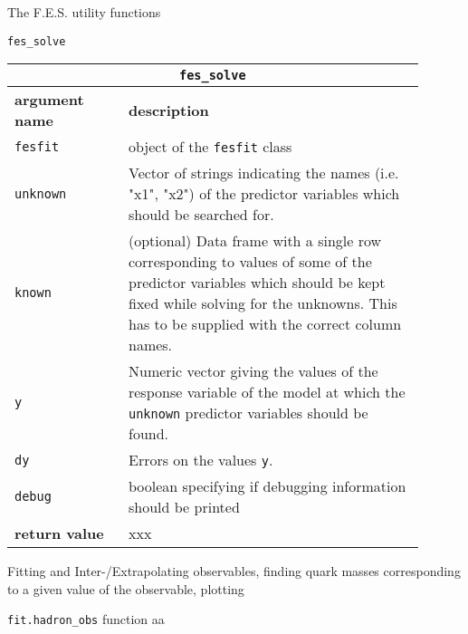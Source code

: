 \documentclass[10pt,a4paper]{article}
\begin{document}
\begin{section}{The F.E.S. utility functions}
\begin{subsection}{ {\tt fes\_solve} }
{ \centering
\begin{tabular}{|p{0.25\linewidth}|p{0.65\linewidth}|}
\hline
\multicolumn{2}{|c|}{ {\tt fes\_solve} } \\
\hline \hline \textbf{argument name} & \textbf{description} \\
\hline {\tt fesfit} & object of the {\tt fesfit} class \\ 
{\tt unknown} & Vector of strings indicating the names (i.e. "x1", "x2") of the predictor variables which should be searched for. \\ 
{\tt known} & (optional) Data frame with a single row corresponding to values of some of the predictor variables which should be kept fixed while solving for the unknowns. This has to be supplied with the correct column names. \\
{\tt y} & Numeric vector giving the values of the response variable of the model at which the {\tt unknown} predictor variables should be found. \\
{\tt dy} & Errors on the values {\tt y}. \\
{\tt debug} & boolean specifying if debugging information should be printed \\
\hline \hline
\textbf{return value} & xxx \\
\hline
\end{tabular}
} %

\end{subsection}

\end{section} 


\begin{section}{Fitting and Inter-/Extrapolating observables, finding quark masses corresponding to a given value of the observable, plotting}

\begin{subsection}{{\tt fit.hadron\_obs} function}
aa
\end{subsection}

\end{section} %
\end{document}
